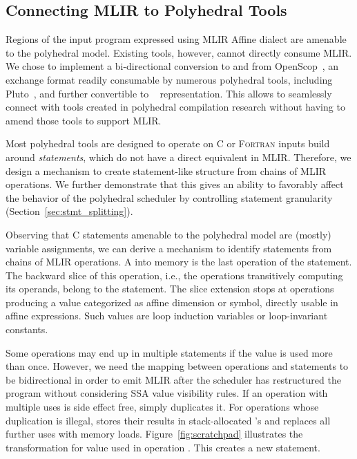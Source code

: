 \subsection{Connecting MLIR to Polyhedral Tools}
\label{sec:polyhedral_tools}

Regions of the input program expressed using MLIR Affine dialect are amenable to the polyhedral model. Existing tools, however, cannot directly consume MLIR. We chose to implement a bi-directional conversion to and from OpenScop~\cite{openscop}, an exchange format readily consumable by numerous polyhedral tools, including Pluto~\cite{Bondhugula2008Pluto}, and further convertible to ~\cite{isl} representation. This allows \tool to seamlessly connect with tools created in polyhedral compilation research without having to amend those tools to support MLIR.

Most polyhedral tools are designed to operate on C or \textsc{Fortran} inputs build around \emph{statements}, which do not have a direct equivalent in MLIR. Therefore, we design a mechanism to create statement-like structure from chains of MLIR operations. We further demonstrate that this gives \tool an ability to favorably affect the behavior of the polyhedral scheduler by controlling statement granularity (Section~\ref{sec:stmt_splitting}).

\label{sec:stmt_formation}
Observing that C statements amenable to the polyhedral model are (mostly) variable assignments, we can derive a mechanism to identify statements from chains of MLIR operations. A  into memory is the last operation of the statement.
The backward slice of this operation, i.e., the operations transitively computing its operands, belong to the statement. The slice extension stops at operations producing a value categorized as affine dimension or symbol, directly usable in affine expressions. Such values are loop induction variables or loop-invariant constants.

Some operations may end up in multiple statements if the value is used more than once. However, we need the mapping between operations and statements to be bidirectional in order to emit MLIR after the scheduler has restructured the program without considering SSA value visibility rules. If an operation with multiple uses is side effect free, \tool simply duplicates it. For operations whose duplication is illegal, \tool stores their results in stack-allocated \memref's and replaces all further uses with memory loads. Figure~\ref{fig:scratchpad} illustrates the transformation for value  used in operation . This creates a new statement.

